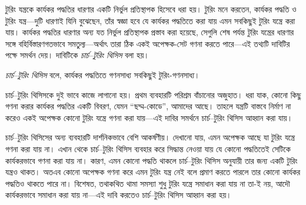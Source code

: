 \documentclass[../../../include/open-logic-section]{subfiles}
\begin{document}

টুরিং যন্ত্রকে কার্যকর পদ্ধতির ধারণার একটি নির্ভুল প্রতিস্থাপক হিসেবে
ধরা হয়। টুরিং মনে করতেন, কার্যকর পদ্ধতি ও টুরিং যন্ত্র—দুটি ধারণাই যিনি
বুঝেছেন, তাঁর স্বজ্ঞা হবে যে কার্যকর পদ্ধতিতে করা যায় এমন সবকিছুই টুরিং
যন্ত্রে করা যায়। কার্যকর পদ্ধতির ধারণার অন্য যত নির্ভুল প্রতিস্থাপক
প্রস্তাব করা হয়েছে, সেগুলি শেষ পর্যন্ত টুরিং যন্ত্রের ধারণার সঙ্গে
বহির্বিস্তারণগতভাবে সমতুল্য—অর্থাৎ তারা ঠিক একই অপেক্ষক-সেট গণনা করতে
পারে—এই তথ্যটি দাবিটির পক্ষে সমর্থন দেয়। দাবিটিকে \emph{চার্চ--টুরিং
থিসিস} বলা হয়।

\begin{defn}[চার্চ--টুরিং থিসিস]
\emph{চার্চ--টুরিং থিসিস} বলে, কার্যকর পদ্ধতিতে গণনসাধ্য সবকিছুই
টুরিং-গণনসাধ্য।
\end{defn}

চার্চ--টুরিং থিসিসকে দুই ভাবে কাজে লাগানো হয়। প্রথম ব্যবহারটি
পরিশ্রম বাঁচানোর অজুহাত। ধরা যাক, কোনো কিছু গণনা করার কার্যকর পদ্ধতির
একটি বিবরণ, যেমন ``ছদ্ম-কোডে'', আমাদের আছে। তাহলে যন্ত্রটি বাস্তবে নির্মাণ
না করেও একই অপেক্ষক কোনো টুরিং যন্ত্রে গণনা করা যায়—এই দাবির সমর্থনে
চার্চ--টুরিং থিসিস আহ্বান করা যায়।

চার্চ--টুরিং থিসিসের অন্য ব্যবহারটি দার্শনিকভাবে বেশি আকর্ষণীয়।
দেখানো যায়, এমন অপেক্ষক আছে যা টুরিং যন্ত্রে গণনা করা যায় না। এখান থেকে
চার্চ--টুরিং থিসিস ব্যবহার করে সিদ্ধান্ত নেওয়া যায় যে কোনো পদ্ধতিতেই
সেটিকে কার্যকরভাবে গণনা করা যায় না। কারণ, এমন কোনো পদ্ধতি থাকলে
চার্চ--টুরিং থিসিস অনুযায়ী তার জন্য একটি টুরিং যন্ত্রও থাকত। অতএব
কোনো অপেক্ষক গণনা করে এমন টুরিং যন্ত্র নেই বলে প্রমাণ করতে পারলে তার কোনো
কার্যকর পদ্ধতিও থাকতে পারে না। বিশেষত, তথাকথিত থামা সমস্যা শুধু টুরিং
যন্ত্রে সমাধান করা যায় না তা-ই নয়, আদৌ কার্যকরভাবে সমাধান করা যায়
না—এই দাবি করতেও চার্চ--টুরিং থিসিস আহ্বান করা হয়।
\end{document}
